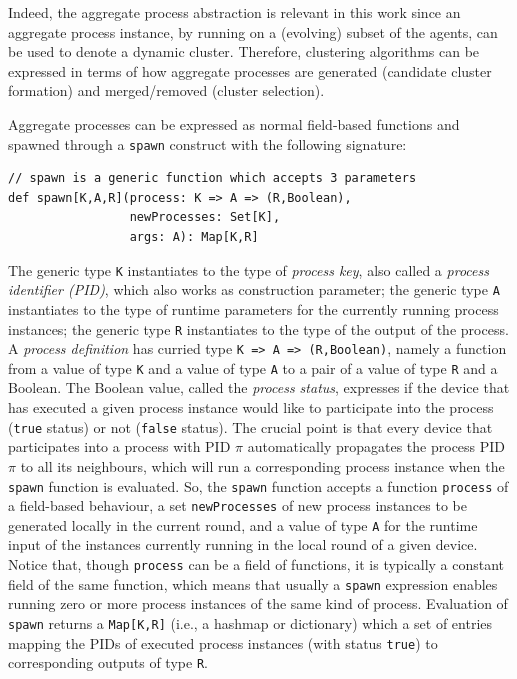 Indeed, the aggregate process abstraction
 is relevant in this work
 since an aggregate process instance,
 by running on a (evolving) subset of the agents,
 can be used to denote a dynamic cluster.
%
Therefore, clustering algorithms
 can be expressed in terms of how
 aggregate processes are generated (candidate cluster formation)
 and
 merged/removed (cluster selection).

Aggregate processes can be expressed as normal field-based functions and spawned through a \lstinline|spawn| construct
 with the following signature:
%
\begin{lstlisting}
// spawn is a generic function which accepts 3 parameters
def spawn[K,A,R](process: K => A => (R,Boolean),
                 newProcesses: Set[K],
                 args: A): Map[K,R]
\end{lstlisting}
%
The generic type \lstinline|K| instantiates to the type of \emph{process key}, also called a \emph{process identifier (PID)}, which also works as construction parameter;
 the generic type \lstinline|A| instantiates to the type of runtime parameters for the currently running process instances;
 the generic type \lstinline|R| instantiates to the type of the output of the process.
%
A \emph{process definition} has curried type \lstinline|K => A => (R,Boolean)|, namely a function from a value of type \lstinline|K| and a value of type \lstinline|A| to a pair of a value of type \lstinline|R| and a Boolean.
%
The Boolean value, called the \emph{process status}, expresses if the device that has executed a given process instance
 would like to participate into the process (\lstinline|true| status)
 or not (\lstinline|false| status).
%
The crucial point is that every device that participates into a process with PID $\pi$ automatically propagates the process PID $\pi$ to all its neighbours, which will run a corresponding process instance when the \lstinline|spawn| function is evaluated.
%
So, the \lstinline|spawn| function accepts a function \lstinline|process| of a field-based behaviour,
 a set \lstinline|newProcesses| of new process instances to be generated locally in the current round,
 and a value of type \lstinline|A| for the runtime input of the instances currently running in the local round of a given device.
%
Notice that, though \lstinline|process| can be a field of functions, it is typically a constant field of the same function, which means that usually a \lstinline|spawn| expression enables running zero or more process instances of the same kind of process.
%
Evaluation of \lstinline|spawn| returns a \lstinline|Map[K,R]|
 (i.e., a hashmap or dictionary) which a set of entries
 mapping the PIDs of executed process instances (with status \lstinline|true|) to corresponding outputs of type \lstinline|R|.
%

